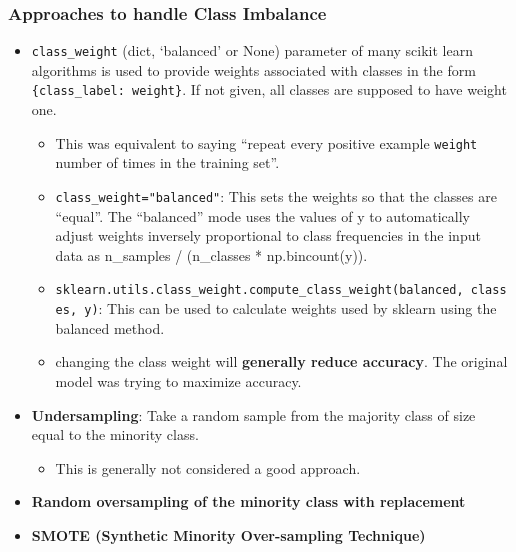 \documentclass[]{article}
\providecommand{\tightlist}{%
  \setlength{\itemsep}{0pt}\setlength{\parskip}{0pt}}
\begin{document}
\hypertarget{approaches-to-handle-class-imbalance}{%
\subsubsection{Approaches to handle Class
Imbalance}\label{approaches-to-handle-class-imbalance}}

\begin{itemize}
\item
  \texttt{class\_weight} (dict, `balanced' or None) parameter of many
  scikit learn algorithms is used to provide weights associated with
  classes in the form \texttt{\{class\_label:\ weight\}}. If not given,
  all classes are supposed to have weight one.

  \begin{itemize}
  \tightlist
  \item
    This was equivalent to saying ``repeat every positive example
    \texttt{weight} number of times in the training set''.
  \item
    \texttt{class\_weight="balanced"}: This sets the weights so that the
    classes are ``equal''. The ``balanced'' mode uses the values of y to
    automatically adjust weights inversely proportional to class
    frequencies in the input data as n\_samples / (n\_classes *
    np.bincount(y)).
  \item
    \texttt{sklearn.utils.class\_weight.compute\_class\_weight(\textquotesingle{}balanced\textquotesingle{},\ classes,\ y)}:
    This can be used to calculate weights used by sklearn using the
    balanced method.
  \item
    changing the class weight will \textbf{generally reduce accuracy}.
    The original model was trying to maximize accuracy.
  \end{itemize}
\item
  \textbf{Undersampling}: Take a random sample from the majority class
  of size equal to the minority class.

  \begin{itemize}
  \tightlist
  \item
    This is generally not considered a good approach.
  \end{itemize}
\item
  \textbf{Random oversampling of the minority class with replacement}
\item
  \textbf{SMOTE (Synthetic Minority Over-sampling Technique)}


\end{itemize}
\end{document}
